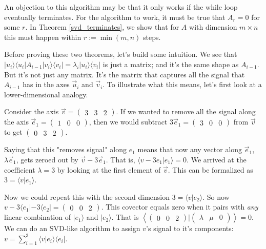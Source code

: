\documentclass{amsbook}
\begin{document}
An objection to this algorithm may be that it only works if the while loop eventually terminates.  For the algorithm to work, it must be true that $A_r=0$ for some $r$.  In Theorem \ref{svd_terminates}, we show that for $A$ with dimension $m\times n$ this must happen within $r := \min(m, n)$ steps.

Before proving these two theorems, let's build some intuition.  We see that $| u _i\rangle\langle u _i|A_{i-1}| v _i\rangle\langle v _i|=\lambda_i| u _i\rangle\langle v _i|$ is just a matrix; and it's the same shape as $A_{i-1}$.  But it's not just any matrix.  It's the matrix that captures all the signal that $A_{i-1}$ has in the axes $\vec u_i$ and $\vec v_i$.  To illustrate what this means, let's first look at a lower-dimensional analogy.

\begin{tcolorbox}[title=Example: Covector Analogy,colback=blue!5]
Consider the axis $\vec v=\left(\begin{array}{ccc} 3 & 3 & 2 \end{array}\right)$.  If we wanted to remove all the signal along the axis $\vec e_1 = \left(\begin{array}{ccc} 1 & 0 & 0 \end{array}\right)$, then we would subtract $3\vec e_1 = \left(\begin{array}{ccc} 3 & 0 & 0 \end{array}\right)$ from $\vec v$ to get $\left(\begin{array}{ccc} 0 & 3 & 2 \end{array}\right)$.

Saying that this "removes signal" along $e_1$ means that now any vector along $\vec e_1$, $\lambda\vec e_1$, gets zeroed out by $\vec v-3\vec e_1$.  That is, $\langle v-3e_1|e_1\rangle=0$.  We arrived at the coefficient $\lambda=3$ by looking at the first element of $\vec v$.  This can be formalized as $3=\langle v|e_1\rangle$.

Now we could repeat this with the second dimension $3=\langle v|e_2\rangle$.  So now $v-3\langle e_1|-3\langle e_2| = \left(\begin{array}{ccc} 0 & 0 & 2 \end{array}\right)$.  This covector equals zero when it pairs with {\em any} linear combination of $|e_1\rangle$ and $|e_2\rangle$.  That is $\left\langle\left(\begin{array}{ccc} 0 & 0 & 2 \end{array}\right)|\left(\begin{array}{ccc} \lambda & \mu & 0 \end{array}\right)\right\rangle = 0$.  We can do an SVD-like algorithm to assign $v$'s signal to it's components: $v = \sum_{i=1}^3\langle v|e_i\rangle\langle e_i|$.


\end{tcolorbox}
\end{document}
